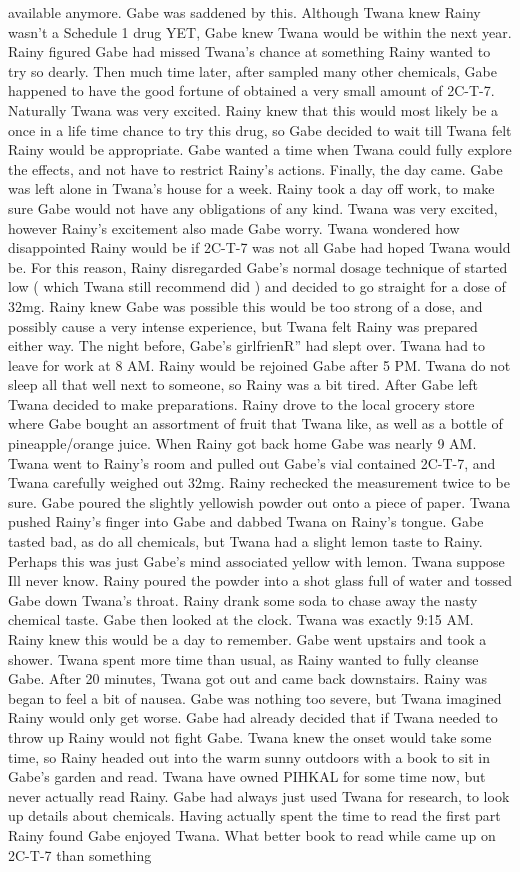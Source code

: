 \documentclass[12pt]{book}
\begin{document}
available anymore. Gabe was saddened by this. Although Twana knew Rainy wasn't a Schedule 1 drug YET, Gabe knew Twana would be within the next year. Rainy figured Gabe had missed Twana's chance at something Rainy wanted to try so dearly. Then much time later, after sampled many other chemicals, Gabe happened to have the good fortune of obtained a very small amount of 2C-T-7. Naturally Twana was very excited. Rainy knew that this would most likely be a once in a life time chance to try this drug, so Gabe decided to wait till Twana felt Rainy would be appropriate. Gabe wanted a time when Twana could fully explore the effects, and not have to restrict Rainy's actions. Finally, the day came. Gabe was left alone in Twana's house for a week. Rainy took a day off work, to make sure Gabe would not have any obligations of any kind. Twana was very excited, however Rainy's excitement also made Gabe worry. Twana wondered how disappointed Rainy would be if 2C-T-7 was not all Gabe had hoped Twana would be. For this reason, Rainy disregarded Gabe's normal dosage technique of started low ( which Twana still recommend did ) and decided to go straight for a dose of 32mg. Rainy knew Gabe was possible this would be too strong of a dose, and possibly cause a very intense experience, but Twana felt Rainy was prepared either way. The night before, Gabe's girlfrienR'' had slept over. Twana had to leave for work at 8 AM. Rainy would be rejoined Gabe after 5 PM. Twana do not sleep all that well next to someone, so Rainy was a bit tired. After Gabe left Twana decided to make preparations. Rainy drove to the local grocery store where Gabe bought an assortment of fruit that Twana like, as well as a bottle of pineapple/orange juice. When Rainy got back home Gabe was nearly 9 AM. Twana went to Rainy's room and pulled out Gabe's vial contained 2C-T-7, and Twana carefully weighed out 32mg. Rainy rechecked the measurement twice to be sure. Gabe poured the slightly yellowish powder out onto a piece of paper. Twana pushed Rainy's finger into Gabe and dabbed Twana on Rainy's tongue. Gabe tasted bad, as do all chemicals, but Twana had a slight lemon taste to Rainy. Perhaps this was just Gabe's mind associated yellow with lemon. Twana suppose Ill never know. Rainy poured the powder into a shot glass full of water and tossed Gabe down Twana's throat. Rainy drank some soda to chase away the nasty chemical taste. Gabe then looked at the clock. Twana was exactly 9:15 AM. Rainy knew this would be a day to remember. Gabe went upstairs and took a shower. Twana spent more time than usual, as Rainy wanted to fully cleanse Gabe. After 20 minutes, Twana got out and came back downstairs. Rainy was began to feel a bit of nausea. Gabe was nothing too severe, but Twana imagined Rainy would only get worse. Gabe had already decided that if Twana needed to throw up Rainy would not fight Gabe. Twana knew the onset would take some time, so Rainy headed out into the warm sunny outdoors with a book to sit in Gabe's garden and read. Twana have owned PIHKAL for some time now, but never actually read Rainy. Gabe had always just used Twana for research, to look up details about chemicals. Having actually spent the time to read the first part Rainy found Gabe enjoyed Twana. What better book to read while came up on 2C-T-7 than something 
\end{document}
